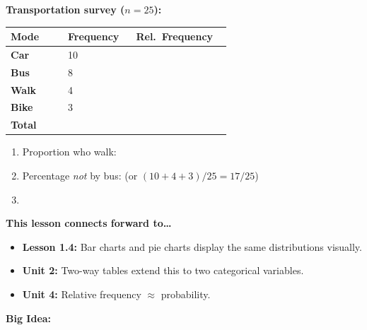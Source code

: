 \documentclass[10pt]{article}
\begin{document}
\begin{practicebox}
\small
\textbf{Transportation survey ($n = 25$):}

\vspace{8pt}
\renewcommand{\arraystretch}{1.8}
\begin{tabularx}{\linewidth}{@{} >{\bfseries}p{0.22\linewidth}
                                    C{0.18\linewidth}
                                    C{0.22\linewidth} @{}}
\textbf{Mode} & \textbf{Frequency} & \textbf{Rel.\ Frequency} \\
\midrule
Car  & 10 &  \\
Bus  & 8  &  \\
Walk & 4  &  \\
Bike & 3  &  \\
\midrule
{}\textbf{Total} &  &  \\
\end{tabularx}

\vspace{10pt}
\begin{enumerate}[leftmargin=1.5em, itemsep=6pt]
  \item Proportion who walk: 
  \item Percentage \textit{not} by bus: 
        (or $(10+4+3)/25 = 17/25$)
  \item {}
\end{enumerate}

\end{practicebox}

\vspace{0.1in}

\begin{spiralbox}
\small
\begin{multicols}{2}

\textbf{This lesson connects forward to\dots}
\begin{itemize}[itemsep=2pt]
  \item \textbf{Lesson 1.4:} Bar charts and pie charts display the same distributions visually.
  \item \textbf{Unit 2:} Two-way tables extend this to two categorical variables.
  \item \textbf{Unit 4:} Relative frequency $\approx$ probability.
\end{itemize}

\columnbreak

\textbf{Big Idea:}\\[4pt]

\end{multicols}
\end{spiralbox}
\end{document}
